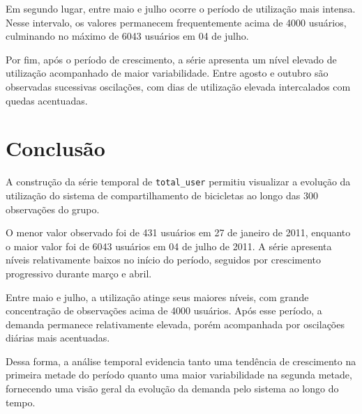 \documentclass[12pt,a4paper]{article}
\begin{document}
Em segundo lugar, entre maio e julho ocorre o período de utilização mais intensa.
Nesse intervalo, os valores permanecem frequentemente acima de 4000 usuários,
culminando no máximo de 6043 usuários em 04 de julho.

Por fim, após o período de crescimento, a série apresenta um nível elevado de
utilização acompanhado de maior variabilidade. Entre agosto e outubro são
observadas sucessivas oscilações, com dias de utilização elevada intercalados
com quedas acentuadas.

\section{Conclusão}

A construção da série temporal de \texttt{total\_user} permitiu visualizar a
evolução da utilização do sistema de compartilhamento de bicicletas ao longo das
300 observações do grupo.

O menor valor observado foi de 431 usuários em 27 de janeiro de 2011, enquanto
o maior valor foi de 6043 usuários em 04 de julho de 2011. A série apresenta
níveis relativamente baixos no início do período, seguidos por crescimento
progressivo durante março e abril.

Entre maio e julho, a utilização atinge seus maiores níveis, com grande
concentração de observações acima de 4000 usuários. Após esse período, a demanda
permanece relativamente elevada, porém acompanhada por oscilações diárias mais
acentuadas.

Dessa forma, a análise temporal evidencia tanto uma tendência de crescimento na
primeira metade do período quanto uma maior variabilidade na segunda metade,
fornecendo uma visão geral da evolução da demanda pelo sistema ao longo do tempo.
\end{document}
